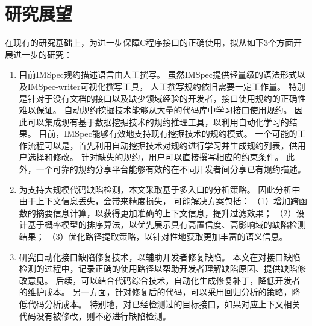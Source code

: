 \section{研究展望}
\label{sec:5.2}
在现有的研究基础上，为进一步保障C程序接口的正确使用，拟从如下3个方面开展进一步的研究：
\begin{enumerate}
	\item 目前IMSpec规约描述语言由人工撰写。
	虽然IMSpec提供轻量级的语法形式以及IMSpec-writer可视化撰写工具，
	人工撰写规约依旧需要一定工作量。
	特别是针对于没有文档的接口以及缺少领域经验的开发者，接口使用规约的正确性难以保证。
	自动规约挖掘技术能够从大量的代码库中学习接口使用规约。
	因此可以集成现有基于数据挖掘技术的规约推理工具，以利用自动化学习的结果。
	目前，IMSpec能够有效地支持现有挖掘技术的规约模式。
	一个可能的工作流程可以是，首先利用自动挖掘技术对规约进行学习并生成规约列表，供用户选择和修改。
	针对缺失的规约，用户可以直接撰写相应的约束条件。
	此外，一个可靠的规约分享平台能够有效的在不同开发者间分享已有规约描述。
	
	\item 为支持大规模代码缺陷检测，本文采取基于多入口的分析策略。
	因此分析中由于上下文信息丢失，会带来精度损失，
	可能解决方案包括：
	（1）增加跨函数的摘要信息计算，以获得更加准确的上下文信息，提升过滤效果；
	（2）设计基于概率模型的排序算法，以优先展示具有高置信度、高影响域的缺陷检测结果；
	（3）优化路径提取策略，以针对性地获取更加丰富的语义信息。
	
	
	\item 研究自动化接口缺陷修复技术，以辅助开发者修复缺陷。
	本文在对接口缺陷检测的过程中，记录正确的使用路径以帮助开发者理解缺陷原因、提供缺陷修改意见。
	后续，可以结合代码综合技术，自动化生成修复补丁，降低开发者的维护成本。
	另一方面，针对修复后的代码，可以采用回归分析的策略，降低代码分析成本。
	特别地，对已经检测过的目标接口，如果对应上下文相关代码没有被修改，则不必进行缺陷检测。
\end{enumerate}
